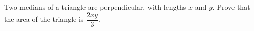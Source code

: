 Two medians of a triangle are perpendicular, with lengths $x$ and $y$. Prove that the area of the triangle is $\dfrac{2xy}{3}$.
